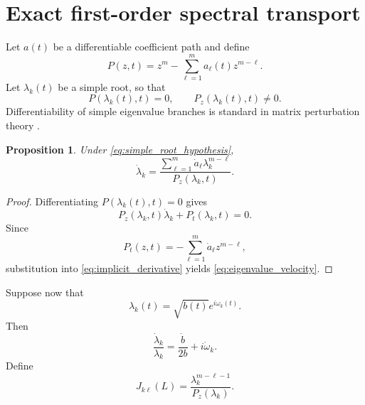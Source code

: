 \documentclass[11pt]{amsart}
\numberwithin{equation}{section}
\theoremstyle{plain}
\newtheorem{proposition}[theorem]{Proposition}
\theoremstyle{definition}
\theoremstyle{remark}
\begin{document}
\section{Exact first-order spectral transport}
\label{sec:first_order_transport}

Let $a(t)$ be a differentiable coefficient path and define
\begin{equation}
P(z,t)=z^m-\sum_{\ell=1}^{m}a_\ell(t)z^{m-\ell}.
\label{eq:time_polynomial}
\end{equation}
Let $\lambda_k(t)$ be a simple root, so that
\begin{equation}
P(\lambda_k(t),t)=0,
\qquad
P_z(\lambda_k(t),t)\neq0.
\label{eq:simple_root_hypothesis}
\end{equation}
Differentiability of simple eigenvalue branches is standard in matrix perturbation theory \cite{Yener2023}.

\begin{proposition}
\label{prop:first_derivative}
Under \eqref{eq:simple_root_hypothesis},
\begin{equation}
\dot\lambda_k
=
\frac{
\displaystyle
\sum_{\ell=1}^{m}
\dot a_\ell\lambda_k^{m-\ell}
}{P_z(\lambda_k,t)}.
\label{eq:eigenvalue_velocity}
\end{equation}
\end{proposition}

\begin{proof}
Differentiating $P(\lambda_k(t),t)=0$ gives
\begin{equation}
P_z(\lambda_k,t)\dot\lambda_k
+P_t(\lambda_k,t)=0.
\label{eq:implicit_derivative}
\end{equation}
Since
\begin{equation}
P_t(z,t)
=-\sum_{\ell=1}^{m}\dot a_\ell z^{m-\ell},
\label{eq:polynomial_time_derivative}
\end{equation}
substitution into \eqref{eq:implicit_derivative} yields \eqref{eq:eigenvalue_velocity}.
\end{proof}

Suppose now that
\begin{equation}
\lambda_k(t)=\sqrt{b(t)}e^{i\omega_k(t)}.
\label{eq:critical_root_parameterization}
\end{equation}
Then
\begin{equation}
\frac{\dot\lambda_k}{\lambda_k}
=
\frac{\dot b}{2b}+i\dot\omega_k.
\label{eq:logarithmic_root_velocity}
\end{equation}
Define
\begin{equation}
J_{k\ell}(L)
=
\frac{\lambda_k^{m-\ell-1}}{P_z(\lambda_k)}.
\label{eq:spectral_transport_matrix}
\end{equation}
\end{document}
